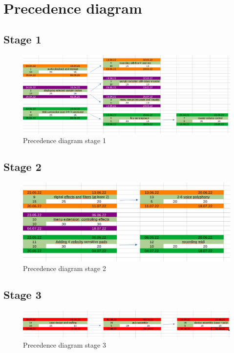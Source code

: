 \section{Precedence diagram}

\subsection{Stage 1}
\begin{figure}[H]
\centering
\includegraphics[width=\textwidth]{prec_chart01.png}
\caption{Precedence diagram stage 1}\label{fig:prec01}
\end{figure}

\subsection{Stage 2}
\begin{figure}[H]
\centering
\includegraphics[width=\textwidth]{prec_chart02.png}
\caption{Precedence diagram stage 2}\label{fig:prec02}
\end{figure}

\subsection{Stage 3}
\begin{figure}[H]
\centering
\includegraphics[width=\textwidth]{prec_chart03.png}
\caption{Precedence diagram stage 3}\label{fig:prec03}
\end{figure}


